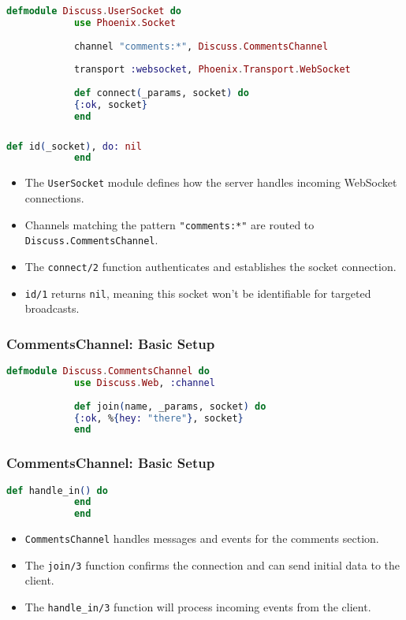 \documentclass[aspectratio=169, table]{beamer}
\begin{document}
	\begin{frame}[fragile]
		\frametitle{}
		\begin{lstlisting}[language=Elixir]
			defmodule Discuss.UserSocket do
			use Phoenix.Socket
			
			channel "comments:*", Discuss.CommentsChannel
			
			transport :websocket, Phoenix.Transport.WebSocket
			
			def connect(_params, socket) do
			{:ok, socket}
			end
		\end{lstlisting}
	\end{frame}
	
	\begin{frame}[fragile]
		\frametitle{}
		\begin{lstlisting}[language=Elixir]
			def id(_socket), do: nil
			end
		\end{lstlisting}
		\begin{itemize}
			\item The \texttt{UserSocket} module defines how the server handles incoming WebSocket connections.
			\item Channels matching the pattern \texttt{"comments:*"} are routed to \texttt{Discuss.CommentsChannel}.
			\item The \texttt{connect/2} function authenticates and establishes the socket connection.
			\item \texttt{id/1} returns \texttt{nil}, meaning this socket won't be identifiable for targeted broadcasts.
		\end{itemize}
	\end{frame}
	
	\begin{frame}[fragile]
		\frametitle{CommentsChannel: Basic Setup}
		\begin{lstlisting}[language=Elixir]
			defmodule Discuss.CommentsChannel do 
			use Discuss.Web, :channel
			
			def join(name, _params, socket) do
			{:ok, %{hey: "there"}, socket}
			end
		\end{lstlisting}
	\end{frame}
	
	\begin{frame}[fragile]
		\frametitle{CommentsChannel: Basic Setup}
		\begin{lstlisting}[language=Elixir]
			def handle_in() do
			end
			end
		\end{lstlisting}
		\begin{itemize}
			\item \texttt{CommentsChannel} handles messages and events for the comments section.
			\item The \texttt{join/3} function confirms the connection and can send initial data to the client.
			\item The \texttt{handle\_in/3} function will process incoming events from the client.
		\end{itemize}
	\end{frame}
	
\end{document}
